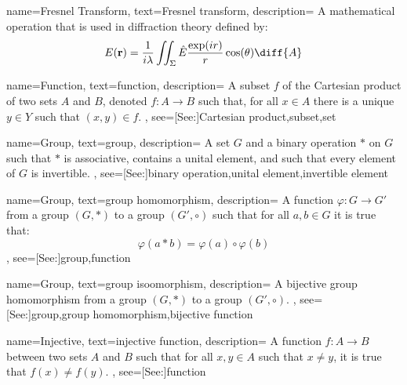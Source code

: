 {
    name={Fresnel Transform},
    text={Fresnel transform},
    description={
        A mathematical operation that is used in diffraction theory
        defined by:
        \begin{equation*}
            E(\mathbf{r})=\frac{1}{i\lambda}
                \iint_{\Sigma}\hat{E}\frac{\exp(ir)}{r}
                    \cos(\theta)\diff{A}
        \end{equation*}
    }
}

{
    name={Function},
    text={function},
    description={
        A subset $f$ of the Cartesian product of two sets $A$ and $B$,
        denoted $f:A\rightarrow{B}$ such that, for all $x\in{A}$ there is
        a unique $y\in{Y}$ such that $(x,y)\in{f}$.
    },
    see=[See:]{Cartesian product,subset,set}
}

{
    name={Group},
    text={group},
    description={
        A set $G$ and a binary operation $*$ on $G$ such that
        $*$ is associative, contains a unital element, and such that
        every element of $G$ is invertible.
    },
    see=[See:]{binary operation,unital element,invertible element}
}

{
    name={Group},
    text={group homomorphism},
    description={
        A function $\varphi:G\rightarrow{G}'$ from a group $(G,*)$ to a group
        $(G',\circ)$ such that for all $a,b\in{G}$ it is true that:
        \begin{equation*}
            \varphi(a*b)=\varphi(a)\circ\varphi(b)
        \end{equation*}
    },
    see=[See:]{group,function}
}

{
    name={Group},
    text={group isoomorphism},
    description={
        A bijective group homomorphism from a group $(G,*)$ to a group
        $(G',\circ)$.
    },
    see=[See:]{group,group homomorphism,bijective function}
}

{
    name={Injective},
    text={injective function},
    description={
        A function $f:A\rightarrow{B}$ between two sets $A$ and $B$ such
        that for all $x,y\in{A}$ such that $x\ne{y}$, it is true that
        $f(x)\ne{f}(y)$.
    },
    see=[See:]{function}
}

